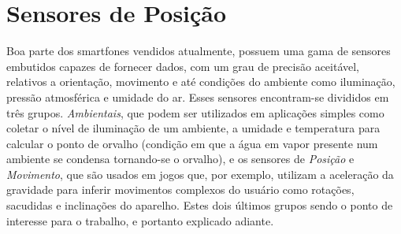 \section{Sensores de Posição}
\label{sec:positionsensors}

Boa parte dos smartfones vendidos atualmente, possuem uma gama de sensores embutidos capazes de fornecer dados, com um grau de precisão aceitável, relativos a orientação, movimento e até condições do ambiente como iluminação, pressão atmosférica e umidade do ar. Esses sensores encontram-se divididos em três grupos. \textit{Ambientais}, que podem ser utilizados em aplicações simples como coletar o nível de iluminação de um ambiente, a umidade e temperatura para calcular o ponto de orvalho (condição em que a água em vapor presente num ambiente se condensa tornando-se o orvalho), e os sensores de \textit{Posição} e \textit{Movimento}, que são usados em jogos que, por exemplo, utilizam a aceleração da gravidade para inferir movimentos complexos do usuário como rotações, sacudidas e inclinações do aparelho. Estes dois últimos grupos sendo o ponto de interesse para o trabalho, e portanto explicado adiante.\par


